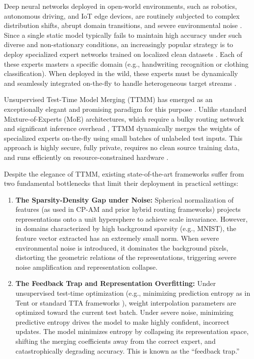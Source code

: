 \documentclass{article}
\theoremstyle{plain}
\theoremstyle{definition}
\theoremstyle{remark}
\begin{document}
Deep neural networks deployed in open-world environments, such as robotics, autonomous driving, and IoT edge devices, are routinely subjected to complex distribution shifts, abrupt domain transitions, and severe environmental noise \cite{hendrycks2019benchmarking, deng2009imagenet, krizhevsky2009learning}. Since a single static model typically fails to maintain high accuracy under such diverse and non-stationary conditions, an increasingly popular strategy is to deploy specialized expert networks trained on localized clean datasets \cite{he2016deep, vaswani2017attention}. Each of these experts masters a specific domain (e.g., handwriting recognition or clothing classification). When deployed in the wild, these experts must be dynamically and seamlessly integrated on-the-fly to handle heterogeneous target streams \cite{matena2021merging, wortsman2022model}.

Unsupervised Test-Time Model Merging (TTMM) has emerged as an exceptionally elegant and promising paradigm for this purpose \cite{anonymous2026a, anonymous2026c}. Unlike standard Mixture-of-Experts (MoE) architectures, which require a bulky routing network and significant inference overhead \cite{shazeer2017outrageously, fedus2022switch, bengio2013estimating}, TTMM dynamically merges the weights of specialized experts on-the-fly using small batches of unlabeled test inputs. This approach is highly secure, fully private, requires no clean source training data, and runs efficiently on resource-constrained hardware \cite{jin2022dataless, choshen2022fusing}.

Despite the elegance of TTMM, existing state-of-the-art frameworks suffer from two fundamental bottlenecks that limit their deployment in practical settings:
\begin{enumerate}
  \item \textbf{The Sparsity-Density Gap under Noise:} Spherical normalization of features (as used in CP-AM and prior hybrid routing frameworks) projects representations onto a unit hypersphere to achieve scale invariance. However, in domains characterized by high background sparsity (e.g., MNIST), the feature vector extracted has an extremely small norm. When severe environmental noise is introduced, it dominates the background pixels, distorting the geometric relations of the representations, triggering severe noise amplification and representation collapse.
  \item \textbf{The Feedback Trap and Representation Overfitting:} Under unsupervised test-time optimization (e.g., minimizing prediction entropy as in Tent \cite{wang2021tent} or standard TTA frameworks \cite{sun2020test, xiao2024beyond}), weight interpolation parameters are optimized toward the current test batch. Under severe noise, minimizing predictive entropy drives the model to make highly confident, incorrect updates. The model minimizes entropy by collapsing its representation space, shifting the merging coefficients away from the correct expert, and catastrophically degrading accuracy. This is known as the ``feedback trap.''
\end{enumerate}
\end{document}
